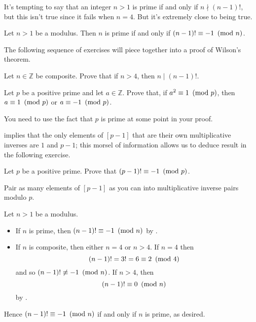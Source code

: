 It's tempting to say that an integer $n>1$ is prime if and only if $n \nmid (n-1)!$, but this isn't true since it fails when $n=4$. But it's extremely close to being true.

\begin{theorem} \label{thmWilson}
Let $n>1$ be a modulus. Then $n$ is prime if and only if $(n-1)! \equiv -1 ~\left(\text{mod}~n\right)$.
\end{theorem}

The following sequence of exercises will piece together into a proof of Wilson's theorem.

\begin{exercise} \label{exCompositeDividesFactorial}
Let $n \in \mathbb{Z}$ be composite. Prove that if $n>4$, then $n \mid (n-1)!$.
\end{exercise}

\begin{exercise} \label{exSquareCongruentToOneModPrimeUnit}
Let $p$ be a positive prime and let $a \in \mathbb{Z}$. Prove that, if $a^2 \equiv 1 ~\left(\text{mod}~p\right)$, then $a \equiv 1 ~\left(\text{mod}~p\right)$ or $a \equiv {-1} ~\left(\text{mod}~p\right)$. 
\begin{backhint}
You need to use the fact that $p$ is prime at some point in your proof.
\end{backhint}
\end{exercise}

 implies that the only elements of $[p-1]$ that are their own multiplicative inverses are $1$ and $p-1$; this morsel of information allows us to deduce result in the following exercise.

\begin{exercise}
\label{exPrimeFactorialCongruentToMinusOne}
Let $p$ be a positive prime. Prove that $(p-1)! \equiv -1 ~\left(\text{mod}~p\right)$.
\begin{backhint}
Pair as many elements of $[p-1]$ as you can into multiplicative inverse pairs modulo $p$.
\end{backhint}
\end{exercise}

\begin{cproof}
Let $n>1$ be a modulus.
\begin{itemize} 
\item If $n$ is prime, then $(n-1)! \equiv -1 ~\left(\text{mod}~n\right)$ by .
\item If $n$ is composite, then either $n=4$ or $n>4$. If $n=4$ then
\[ (n-1)! = 3! = 6 \equiv 2 ~\left(\text{mod}~4\right) \]
and so $(n-1)! \not\equiv -1 ~\left(\text{mod}~n\right)$. If $n>4$, then
\[ (n-1)! \equiv 0 ~\left(\text{mod}~n\right) \]
by .
\end{itemize}
Hence $(n-1)! \equiv -1 ~\left(\text{mod}~n\right)$ if and only if $n$ is prime, as desired.
\end{cproof}

